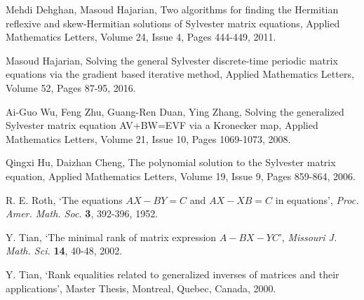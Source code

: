 \documentclass[preprint,12pt,authoryear]{elsarticle}
\theoremstyle{cupthm}
\theoremstyle{cupdefn}
\theoremstyle{cuprem}
\numberwithin{equation}{section}
\begin{document}
\begin{thebibliography}{100}



 Mehdi Dehghan, Masoud Hajarian, Two algorithms for finding the Hermitian reflexive and skew-Hermitian solutions of Sylvester matrix equations, Applied Mathematics Letters, Volume 24, Issue 4, Pages 444-449, 2011.

 Masoud Hajarian, Solving the general Sylvester discrete-time periodic matrix equations via the gradient based iterative method, Applied Mathematics Letters, Volume 52, Pages 87-95, 2016.

 Ai-Guo Wu, Feng Zhu, Guang-Ren Duan, Ying Zhang, Solving the generalized Sylvester matrix equation AV+BW=EVF via a Kronecker map, Applied Mathematics Letters, Volume 21, Issue 10, Pages 1069-1073, 2008.

 Qingxi Hu, Daizhan Cheng, The polynomial solution to the Sylvester matrix equation, Applied Mathematics Letters, Volume 19, Issue 9, Pages 859-864, 2006.

 R. E. Roth, `The equations $AX-BY=C$ and $AX-XB=C$ in equations', \textsl{Proc. Amer. Math. Soc.} \textbf{3}, 392-396, 1952.

 Y. Tian, `The minimal rank of matrix expression $A-BX-YC$', \textsl{Missouri J. Math. Sci.} \textbf{14}, 40-48, 2002.

 Y. Tian, `Rank equalities related to generalized inverses of matrices and their applications', Master Thesis, Montreal, Quebec, Canada, 2000.

\end{thebibliography}
\end{document}
